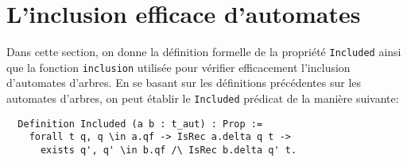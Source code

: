 




\section{L'inclusion efficace d'automates}
\label{sec:inclusion}

Dans cette section, on donne la définition formelle de la propriété \lstinline!Included! ainsi
que la fonction \lstinline!inclusion!  utilisée pour vérifier efficacement l'inclusion d'automates d'arbres.
En se basant sur les définitions précédentes sur les automates d'arbres, on peut établir
le \lstinline!Included! prédicat de la manière suivante:

\begin{lstlisting}
  Definition Included (a b : t_aut) : Prop :=
    forall t q, q \in a.qf -> IsRec a.delta q t ->
      exists q', q' \in b.qf /\ IsRec b.delta q' t.
\end{lstlisting}



